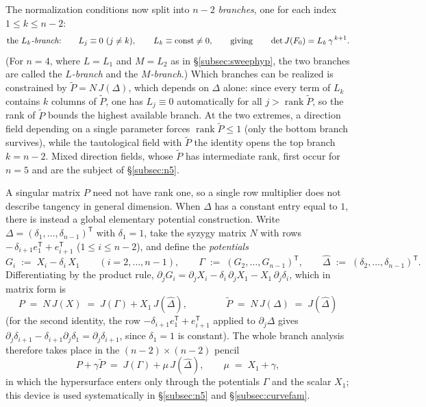 \documentclass[11pt]{article}
\numberwithin{equation}{section}
\theoremstyle{plain}
\theoremstyle{definition}
\theoremstyle{remark}
\begin{document}
The normalization conditions now split into $n-2$ \emph{branches}, one for each
index $1\le k\le n-2$:
\[
\text{the \emph{$L_k$-branch}:}\qquad
L_j\equiv0\ (j\neq k),\qquad L_k\equiv\text{const}\neq0,
\qquad\text{giving}\qquad \det J(F_0)=L_k\,\gamma^{\,k+1} .
\]
(For $n=4$, where $L=L_1$ and $M=L_2$ as in \S\ref{subsec:sweephyp}, the two
branches are called the \emph{$L$-branch} and the \emph{$M$-branch}.)
Which branches can be realized is constrained by $\widetilde P=N\,J(\Delta)$,
which depends on $\Delta$ alone: since every term of $L_k$ contains $k$ columns
of $\widetilde P$, one has $L_j\equiv0$ automatically for all
$j>\operatorname{rank}\widetilde P$, so the rank of $\widetilde P$ bounds the
highest available branch. At the two extremes, a direction field depending on a
single parameter forces $\operatorname{rank}\widetilde P\le1$ (only the bottom
branch survives), while the tautological field with $\widetilde P$ the identity
opens the top branch $k=n-2$. Mixed direction fields, whose $\widetilde P$ has
intermediate rank, first occur for $n=5$ and are the subject of
\S\ref{subsec:n5}.

A singular matrix $P$ need not have rank one, so a single row multiplier
does not describe tangency in general dimension. When $\Delta$ has a
constant entry equal to $1$, there is instead a global elementary
potential construction. Write
$\Delta=(\delta_1,\dots,\delta_{n-1})^{\mathsf T}$ with $\delta_1=1$, take the
syzygy matrix $N$ with rows $-\,\delta_{i+1}e_1^{\mathsf T}+e_{i+1}^{\mathsf T}$
($1\le i\le n-2$), and define the \emph{potentials}
\[
G_i\;:=\;X_i-\delta_i\,X_1\qquad(i=2,\dots,n-1),
\qquad
\Gamma\;:=\;(G_2,\dots,G_{n-1})^{\mathsf T},
\qquad
\widehat\Delta\;:=\;(\delta_2,\dots,\delta_{n-1})^{\mathsf T}.
\]
Differentiating by the product rule,
$\partial_jG_i=\partial_jX_i-\delta_i\,\partial_jX_1-X_1\,\partial_j\delta_i$,
which in matrix form is
\[
P\;=\;N\,J(X)\;=\;J(\Gamma)+X_1\,J(\widehat\Delta),
\qquad\qquad
\widetilde P\;=\;N\,J(\Delta)\;=\;J(\widehat\Delta)
\]
(for the second identity, the row $-\delta_{i+1}e_1^{\mathsf T}+e_{i+1}^{\mathsf T}$
applied to $\partial_j\Delta$ gives
$\partial_j\delta_{i+1}-\delta_{i+1}\partial_j\delta_1=\partial_j\delta_{i+1}$,
since $\delta_1=1$ is constant). The whole branch analysis therefore takes
place in the $(n-2)\times(n-2)$ pencil
\[
P+\gamma\widetilde P\;=\;J(\Gamma)+\mu\,J(\widehat\Delta),
\qquad
\mu\;=\;X_1+\gamma ,
\]
in which the hypersurface enters only through the potentials $\Gamma$ and the
scalar $X_1$; this device is used systematically in \S\ref{subsec:n5}
and \S\ref{subsec:curvefam}.
\end{document}
